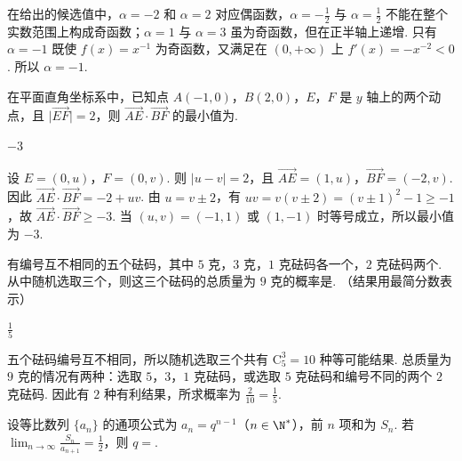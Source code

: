 \begin{solution}
在给出的候选值中，\(\alpha=-2\) 和 \(\alpha=2\) 对应偶函数，\(\alpha=-\frac12\) 与 \(\alpha=\frac12\) 不能在整个实数范围上构成奇函数；\(\alpha=1\) 与 \(\alpha=3\) 虽为奇函数，但在正半轴上递增. 只有 \(\alpha=-1\) 既使 \(f(x)=x^{-1}\) 为奇函数，又满足在 \((0,+\infty)\) 上 \(f'(x)=-x^{-2}<0\). 所以 \(\alpha=-1\).
\end{solution}

\begin{problem}
在平面直角坐标系中，已知点 \(A(-1,0)\)，\(B(2,0)\)，\(E\)，\(F\) 是 \(y\) 轴上的两个动点，且 \(\lvert\overrightarrow{EF}\rvert=2\)，则 \(\overrightarrow{AE}\cdot\overrightarrow{BF}\) 的最小值为\fillinblank{}.
\end{problem}

\begin{answer}
\(-3\)
\end{answer}

\begin{solution}
设 \(E=(0,u)\)，\(F=(0,v)\). 则 \(\lvert u-v\rvert=2\)，且 \(\overrightarrow{AE}=(1,u)\)，\(\overrightarrow{BF}=(-2,v)\). 因此 \(\overrightarrow{AE}\cdot\overrightarrow{BF}=-2+uv\). 由 \(u=v\pm2\)，有 \(uv=v(v\pm2)=(v\pm1)^2-1\ge-1\)，故 \(\overrightarrow{AE}\cdot\overrightarrow{BF}\ge-3\). 当 \((u,v)=(-1,1)\) 或 \((1,-1)\) 时等号成立，所以最小值为 \(-3\).
\end{solution}

\begin{problem}
有编号互不相同的五个砝码，其中 \(5\) 克，\(3\) 克，\(1\) 克砝码各一个，\(2\) 克砝码两个. 从中随机选取三个，则这三个砝码的总质量为 \(9\) 克的概率是\fillinblank{}. （结果用最简分数表示）
\end{problem}

\begin{answer}
\(\frac15\)
\end{answer}

\begin{solution}
五个砝码编号互不相同，所以随机选取三个共有 \(\mathrm C_5^3=10\) 种等可能结果. 总质量为 \(9\) 克的情况有两种：选取 \(5\)，\(3\)，\(1\) 克砝码，或选取 \(5\) 克砝码和编号不同的两个 \(2\) 克砝码. 因此有 \(2\) 种有利结果，所求概率为 \(\frac{2}{10}=\frac15\).
\end{solution}

\begin{problem}
设等比数列 \(\{a_n\}\) 的通项公式为 \(a_n=q^{n-1}\)（\(n\in\N^*\)），前 \(n\) 项和为 \(S_n\). 若 \(\displaystyle\lim_{n\to\infty}\frac{S_n}{a_{n+1}}=\frac12\)，则 \(q=\)\fillinblank{}.
\end{problem}

